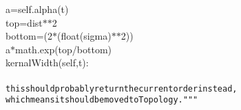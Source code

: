 {{\begin{tabbing}
\hspace{48pt}a\hspace{6pt}=\hspace{6pt}self.alpha(t)\\
\hspace{48pt}top\hspace{6pt}=\hspace{6pt}dist$\ast$$\ast$2\\
\hspace{48pt}bottom\hspace{6pt}=\hspace{6pt}(2$\ast$(float(sigma)$\ast$$\ast$2))\\
\hspace{6pt}a\hspace{6pt}$\ast$\hspace{6pt}math.exp(\dash{}top/bottom)\\
\hspace{6pt}kernalWidth(self,t):\\
\\
{\texttt{\hspace{66pt}this\hspace{6pt}should\hspace{6pt}probably\hspace{6pt}return\hspace{6pt}the\hspace{6pt}current\hspace{6pt}order\hspace{6pt}instead,}}\\
{\texttt{\hspace{66pt}which\hspace{6pt}means\hspace{6pt}it\hspace{6pt}should\hspace{6pt}be\hspace{6pt}moved\hspace{6pt}to\hspace{6pt}Topology.\string"}}{\texttt{\string"\string"}}\\

\end{tabbing}}}
